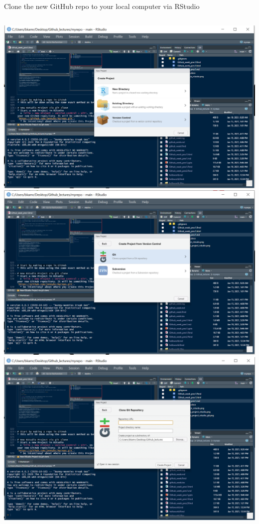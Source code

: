 \documentclass[
  ignorenonframetext,
]{beamer}
\begin{document}
\begin{frame}[fragile]{Clone the new GitHub repo to your local computer
via RStudio}
\begin{columns}[T]
\begin{column}{0.48\textwidth}
\includegraphics{pres_figs/new_project_rstudio.png}
\includegraphics{pres_figs/new_project_rstudio_git.png}
\includegraphics{pres_figs/new_project_rstudio_git_url.png}
\end{column}
\end{columns}


\end{frame}
\end{document}
